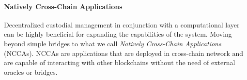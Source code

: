 \documentclass{article}
\begin{document}
    \paragraph{Natively Cross-Chain Applications}
    Decentralized custodial management in conjunction with a computational layer can be highly beneficial for expanding the capabilities of the system.
    Moving beyond simple bridges to what we call \emph{Natively Cross-Chain Applications} (NCCAs).
    NCCAs are applications that are deployed in cross-chain network and are capable of interacting with other blockchains without the need of external oracles or bridges.
\end{document}
